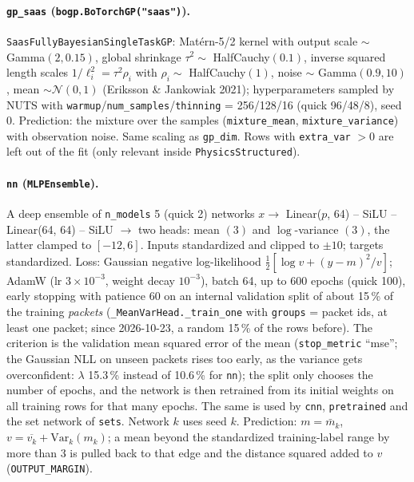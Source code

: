 \documentclass[10pt]{article}
\newcommand{\code}[1]{\texttt{#1}}
\begin{document}
\paragraph{\code{gp\_saas} (\code{bogp.BoTorchGP("saas")}).} \code{SaasFullyBayesianSingleTaskGP}: Mat\'ern-5/2 kernel
with output scale $\sim$ Gamma$(2, 0.15)$, global shrinkage $\tau^2 \sim$ HalfCauchy$(0.1)$, inverse squared length scales
$1/\ell_i^2 = \tau^2 \rho_i$ with $\rho_i \sim$ HalfCauchy$(1)$, noise $\sim$ Gamma$(0.9, 10)$, mean $\sim\mathcal N(0,1)$
(Eriksson \& Jankowiak 2021); hyperparameters sampled by NUTS with \code{warmup}/\code{num\_samples}/\code{thinning}
= 256/128/16 (quick 96/48/8), seed 0. Prediction: the mixture over the samples (\code{mixture\_mean},
\code{mixture\_variance}) with observation noise. Same scaling as \code{gp\_dim}. Rows with \code{extra\_var} $> 0$
are left out of the fit (only relevant inside \code{PhysicsStructured}).

\paragraph{\code{nn} (\code{MLPEnsemble}).} A deep ensemble of \code{n\_models} 5 (quick 2) networks
$x \to$ Linear($p$, 64) -- SiLU -- Linear(64, 64) -- SiLU $\to$ two heads: mean $(3)$ and $\log$-variance $(3)$, the
latter clamped to $[-12, 6]$. Inputs standardized and clipped to $\pm10$; targets standardized. Loss: Gaussian negative
log-likelihood $\tfrac12[\log v + (y - m)^2/v]$; AdamW (lr $3\times10^{-3}$, weight decay $10^{-3}$), batch 64, up to
600 epochs (quick 100), early stopping with patience 60 on an internal validation split of about 15\,\% of the
training \emph{packets} (\code{\_MeanVarHead.\_train\_one} with \code{groups} = packet ids, at least one packet; since
2026-10-23, a random 15\,\% of the rows before). The criterion is the validation mean squared error of the mean
(\code{stop\_metric} ``mse''; the Gaussian NLL on unseen packets rises too early, as the variance gets overconfident:
$\lambda$ 15.3\,\% instead of 10.6\,\% for \code{nn}); the split only chooses the number of epochs, and the network is then
retrained from its initial weights on all training rows for that many epochs. The same is used by \code{cnn},
\code{pretrained} and the set network of \code{sets}.
Network $k$ uses seed $k$. Prediction: $m = \bar m_k$, $v = \overline{v_k} + \mathrm{Var}_k(m_k)$; a mean beyond the
standardized training-label range by more than 3 is pulled back to that edge and the distance squared added to $v$
(\code{OUTPUT\_MARGIN}).
\end{document}
